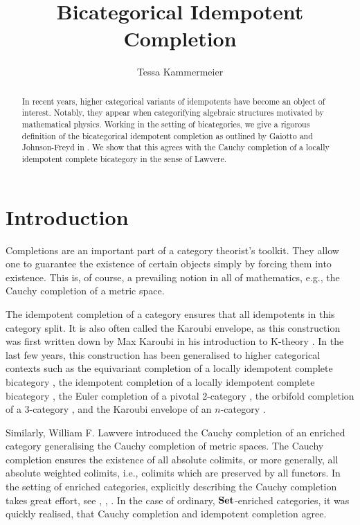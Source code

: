 \documentclass[12pt,oneside,reqno,a4paper]{article}
\theoremstyle{definition}
\newcommand{\Set}{\textbf{\textup{Set}}}
\begin{document}
\renewcommand{\thepage}{C-\Roman{page}}
\title{Bicategorical Idempotent Completion}
\author{Tessa Kammermeier}
\maketitle

\begin{abstract}
In recent years, higher categorical variants of idempotents have become an object of interest. Notably, they appear when categorifying algebraic structures motivated by mathematical physics. Working in the setting of bicategories, we give a rigorous definition of the bicategorical idempotent completion as outlined by Gaiotto and Johnson-Freyd in \cite{GJF}. We show that this agrees with the Cauchy completion of a locally idempotent complete bicategory in the sense of Lawvere.
\end{abstract}

\tableofcontents

\section{Introduction}

Completions are an important part of a category theorist's toolkit. They allow one to guarantee the existence of certain objects simply by forcing them into existence. This is, of course, a prevailing notion in all of mathematics, e.g., the Cauchy completion of a metric space.

The idempotent completion of a category ensures that all idempotents in this category split. It is also often called the Karoubi envelope, as this construction was first written down by Max Karoubi in his introduction to K-theory \cite{K}. In the last few years, this construction has been generalised to higher categorical contexts such as the equivariant completion of a locally idempotent complete bicategory \cite{CR}, the idempotent completion of a locally idempotent complete bicategory \cite{DR}, the Euler completion of a pivotal 2-category \cite{CRS}, the orbifold completion of a 3-category \cite{CM}, and the Karoubi envelope of an $n$-category \cite{GJF}.

Similarly, William F. Lawvere introduced the Cauchy completion of an enriched category \cite{L} generalising the Cauchy completion of metric spaces. The Cauchy completion ensures the existence of all absolute colimits, or more generally, all absolute weighted colimits, i.e., colimits which are preserved by all functors. In the setting of enriched categories, explicitly describing the Cauchy completion takes great effort, see \cite{BD}, \cite{NST}, \cite{LT}. In the case of ordinary, $\Set$-enriched categories, it was quickly realised, that Cauchy completion and idempotent completion agree.
\end{document}

